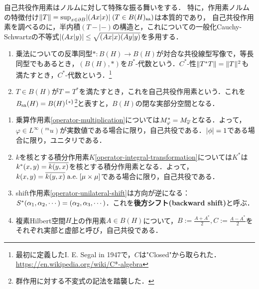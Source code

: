 \documentclass[uplatex,dvipdfmx]{jsreport}
\begin{document}
\begin{tcolorbox}[colframe=ForestGreen, colback=ForestGreen!10!white,breakable,colbacktitle=ForestGreen!40!white,coltitle=black,fonttitle=\bfseries\sffamily,
title=]
    自己共役作用素はノルムに対して特殊な振る舞いをする．
    特に，作用素ノルムの特徴付け$\|T\|=\sup_{x\in\partial B}\lvert(Ax|x)\rvert\;(T\in B(H)_{\mathrm{sa}})$は本質的であり，
    自己共役作用素を調べるのに，半内積$(T-|-)$の構造と，これについての一般化Cauchy-Schwartzの不等式$\lvert(Ax|y)\rvert\le\sqrt{(Ax|x)(Ay|y)}$を多用する．
\end{tcolorbox}

\begin{definition}\mbox{}
    \begin{enumerate}
        \item 乗法についての反準同型$*:B(H)\to B(H)$が対合な共役線型写像で，等長同型でもあるとき，$(B(H),*)$を$B^*$-代数という．$C^*$-性$\|T^*T\|=\|T\|^2$も満たすとき，$C^*$-代数という．\footnote{最初に定義したI. E. Segal in 1947で，$C$は"Closed"から取られた．\url{https://en.wikipedia.org/wiki/C*-algebra}}
        \item $T\in B(H)$が$T=T^*$を満たすとき，これを自己共役作用素という．これを$B_{\mathrm{sa}}(H)=B(H)^{\left\{*\right\}}$\footnote{群作用に対する不変式の記法を踏襲した．}と表すと，$B(H)$の閉な実部分空間となる．
    \end{enumerate}
\end{definition}

\begin{example}[随伴]\mbox{}
    \begin{enumerate}
        \item 乗算作用素\ref{operator-multiplication}については$M^*_\varphi=M_{\overline{\varphi}}$となる．よって，$\varphi\in L^\infty(^mu)$が実数値である場合に限り，自己共役である．$\lvert\phi\rvert=1$である場合に限り，ユニタリである．
        \item $k$を核とする積分作用素$K$\ref{operator-integral-transformation}については$K^*$は$k^*(x,y)=\overline{k(y,x)}$を核とする積分作用素となる．よって，$k(x,y)=\overline{k(y,x)}\;\mathrm{a.e.}\;[\mu\times\mu]$である場合に限り，自己共役である．
        \item shift作用素\ref{operator-unilateral-shift}は方向が逆になる：$S^*(\alpha_1,\alpha_2,\cdots)=(\alpha_2,\alpha_3,\cdots)$．これを\textbf{後方シフト(backward shift)}と呼ぶ．
        \item 複素Hilbert空間$H$上の作用素$A\in B(H)$について，$B:=\frac{A+A^*}{2},C:=\frac{A-A^*}{2}$をそれぞれ実部と虚部と呼び，自己共役である．
    \end{enumerate}
\end{example}
\end{document}
